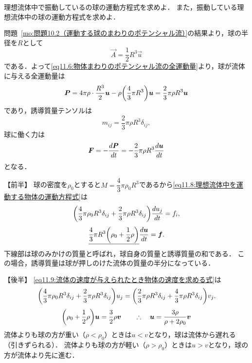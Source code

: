 \begin{mondai}{}{}
理想流体中で振動しているの球の運動方程式を求めよ．
また，振動している理想流体中の球の運動方程式を求めよ．
\end{mondai}
\begin{kaitou}

問題~\ref{mo:問題10.2（運動する球のまわりのポテンシャル流）}の結果より，球の半径を$R$として
\[
    \vec{A} = \frac{1}{2} R^3 \vec{u}
\]
である．よって\eqref{eq11.6:物体まわりのポテンシャル流の全運動量}より，球が流体に与える全運動量は
\[
    \vec{P} = 4\pi\rho \cdot \frac{R^3}{2} \vec{u} - \rho \pqty{\frac{4}{3}\pi R^3} \vec{u}
    = \frac{2}{3}\pi\rho R^3 \vec{u}
\]
であり，誘導質量テンソルは
\[
    m_{ij} = \frac{2}{3}\pi\rho R^3 \delta_{ij},
\]
球に働く力は
\[
    \vb*{F} = -\dv{\vb*{P}}{t} = -\frac{2}{3}\pi\rho R^3 \dv{\vb*{u}}{t}
\]
となる．


\noindent
【前半】
球の密度を$\rho_0$とすると$M=\dfrac{4}{3}\pi\rho_0 R^3$であるから\eqref{eq11.8:理想流体中を運動する物体の運動方程式}は
\[
    \pqty{ \frac{4}{3}\pi\rho_0 R^3\delta_{ij} +\frac{2}{3}\pi\rho R^3 \delta_{ij} } \dv{u_j}{t} = f_i,
\]
\[
    \underline{ \frac{4}{3}\pi R^3 \pqty{ \rho_0 + \frac{1}{2}\rho } } \dv{\vec{u}}{t} = \vec{f} .
\]
下線部は球のみかけの質量と呼ばれ，球自身の質量と誘導質量の和である．
この場合，誘導質量は球が押しのけた流体の質量の半分になっている．


\noindent
【後半】
\eqref{eq11.9:流体の速度が与えられたとき物体の速度を求める式}は
\[
    \pqty{ \frac{4}{3}\pi\rho_0 R^3 \delta_{ij} + \frac{2}{3}\pi\rho R^3 \delta_{ij} } u_j 
    = \pqty{ \frac{2}{3}\pi\rho R^3 \delta_{ij} + \frac{4}{3}\pi\rho R^3 \delta_{ij} }v_j .
\]
\[
    \pqty{ \rho_0 + \frac{1}{2}\rho } \vec{u} = \frac{3}{2} \rho \v
    \qquad\yueni \vec{u} = \frac{3\rho}{\rho+2\rho_0} \v
\]
流体よりも球の方が重い（$\rho<\rho_0$）ときは$u<v$となり，球は流体から遅れる（引きずられる）．
流体よりも球の方が軽い（$\rho>\rho_0$）ときは$u>v$となり，球の方が流体より先に進む．


\end{kaitou}




